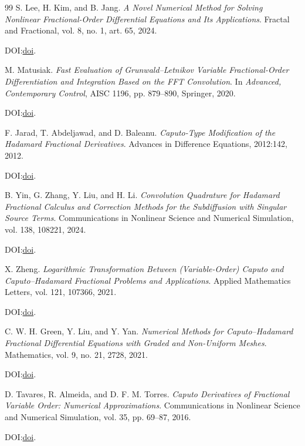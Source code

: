 \documentclass[11pt]{article}
\begin{document}
\begin{thebibliography}{99}
S. Lee, H. Kim, and B. Jang.
\emph{A Novel Numerical Method for Solving Nonlinear Fractional-Order Differential Equations and Its Applications}.
Fractal and Fractional, vol. 8, no. 1, art. 65, 2024.
\par\noindent DOI:\@ \href{https://doi.org/10.3390/fractalfract8010065}{doi}.

M. Matusiak.
\emph{Fast Evaluation of Grunwald--Letnikov Variable Fractional-Order Differentiation and Integration Based on the FFT Convolution}.
In \emph{Advanced, Contemporary Control}, AISC 1196, pp. 879--890, Springer, 2020.
\par\noindent DOI:\@ \href{https://doi.org/10.1007/978-3-030-50936-1_74}{doi}.

F. Jarad, T. Abdeljawad, and D. Baleanu.
\emph{Caputo-Type Modification of the Hadamard Fractional Derivatives}.
Advances in Difference Equations, 2012:142, 2012.
\par\noindent DOI:\@ \href{https://doi.org/10.1186/1687-1847-2012-142}{doi}.

B. Yin, G. Zhang, Y. Liu, and H. Li.
\emph{Convolution Quadrature for Hadamard Fractional Calculus and Correction Methods for the Subdiffusion with Singular Source Terms}.
Communications in Nonlinear Science and Numerical Simulation, vol. 138,
108221, 2024.
\par\noindent DOI:\@ \href{https://doi.org/10.1016/j.cnsns.2024.108221}{doi}.

X. Zheng.
\emph{Logarithmic Transformation Between (Variable-Order) Caputo and Caputo--Hadamard Fractional Problems and Applications}.
Applied Mathematics Letters, vol. 121, 107366, 2021.
\par\noindent DOI:\@ \href{https://doi.org/10.1016/j.aml.2021.107366}{doi}.

C. W. H. Green, Y. Liu, and Y. Yan.
\emph{Numerical Methods for Caputo--Hadamard Fractional Differential Equations with Graded and Non-Uniform Meshes}.
Mathematics, vol. 9, no. 21, 2728, 2021.
\par\noindent DOI:\@ \href{https://doi.org/10.3390/math9212728}{doi}.

D. Tavares, R. Almeida, and D. F. M. Torres.
\emph{Caputo Derivatives of Fractional Variable Order: Numerical Approximations}.
Communications in Nonlinear Science and Numerical Simulation, vol. 35,
pp. 69--87, 2016.
\par\noindent DOI:\@ \href{https://doi.org/10.1016/j.cnsns.2015.10.027}{doi}.


\end{thebibliography}
\end{document}
